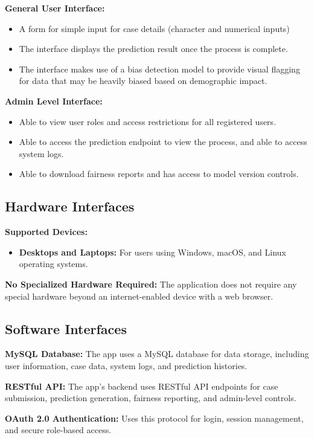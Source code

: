\documentclass[12pt]{article}
\begin{document}
\textbf{General User Interface:}
\begin{itemize}
    \item A form for simple input for case details (character and numerical inputs)
    \item The interface displays the prediction result once the process is complete.
    \item The interface makes use of a bias detection model to provide visual flagging for data that may be heavily biased based on demographic impact.
\end{itemize}

\textbf{Admin Level Interface:}
\begin{itemize}
    \item Able to view user roles and access restrictions for all registered users.
    \item Able to access the prediction endpoint to view the process, and able to access system logs.
    \item Able to download fairness reports and has access to model version controls.
\end{itemize}

\subsection{Hardware Interfaces}

\textbf{Supported Devices:}
\begin{itemize}
    \item \textbf{Desktops and Laptops:} For users using Windows, macOS, and Linux operating systems.
\end{itemize}

\textbf{No Specialized Hardware Required:} The application does not require any special hardware beyond an internet-enabled device with a web browser.

\subsection{Software Interfaces}

\textbf{MySQL Database:} The app uses a MySQL database for data storage, including user information, case data, system logs, and prediction histories.

\textbf{RESTful API:} The app’s backend uses RESTful API endpoints for case submission, prediction generation, fairness reporting, and admin-level controls.

\textbf{OAuth 2.0 Authentication:} Uses this protocol for login, session management, and secure role-based access.
\end{document}
